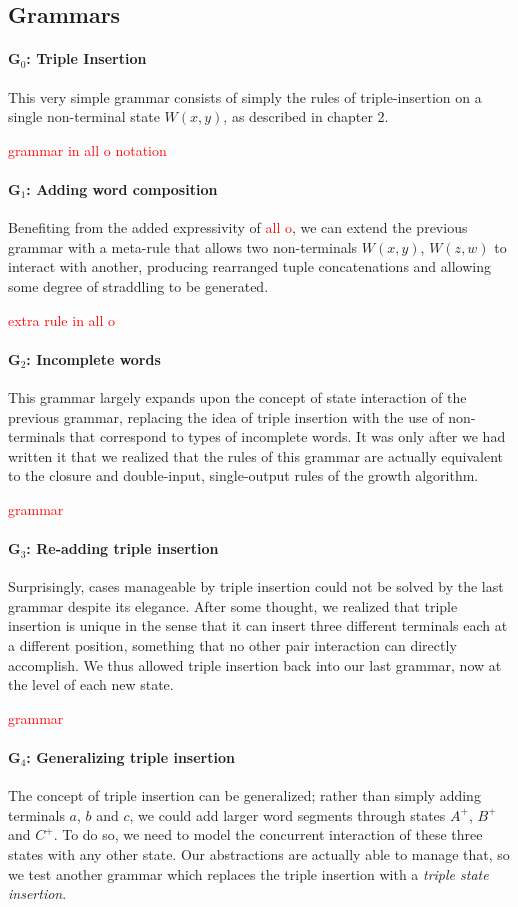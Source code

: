 \documentclass[nonatbib,numbers,10pt]{sigplanconf}
\newcommand\todo[1]{\textcolor{red}{#1}}
\begin{document}
\subsection{Grammars}
\paragraph{G$_0$: Triple Insertion}
This very simple grammar consists of simply the rules of triple-insertion on a single non-terminal state $W(x,y)$, as described in chapter 2.

\todo{grammar in all o notation}
\paragraph{G$_1$: Adding word composition}
Benefiting from the added expressivity of \todo{all o}, we can extend the previous grammar with a meta-rule that allows two non-terminals $W(x,y)$, $W(z,w)$ to interact with another, producing rearranged tuple concatenations and allowing some degree of straddling to be generated.

\todo{extra rule in all o}
\paragraph{G$_2$: Incomplete words}
This grammar largely expands upon the concept of state interaction of the previous grammar, replacing the idea of triple insertion with the use of non-terminals that correspond to types of incomplete words. It was only after we had written it that we realized that the rules of this grammar are actually equivalent to the closure and double-input, single-output rules of the growth algorithm.

\todo{grammar} 
\paragraph{G$_3$: Re-adding triple insertion}
Surprisingly, cases manageable by triple insertion could not be solved by the last grammar despite its elegance. After some thought, we realized that triple insertion is unique in the sense that it can insert three different terminals each at a different position, something that no other pair interaction can directly accomplish. We thus allowed triple insertion back into our last grammar, now at the level of each new state.

\todo{grammar}

\paragraph{G$_4$: Generalizing triple insertion}
The concept of triple insertion can be generalized; rather than simply adding terminals $a$, $b$ and $c$, we could add larger word segments through states $A^{+}$, $B^{+}$ and $C^{+}$. To do so, we need to model the concurrent interaction of these three states with any other state. Our abstractions are actually able to manage that, so we test another grammar which replaces the triple insertion with a \textit{triple state insertion}.
\end{document}
